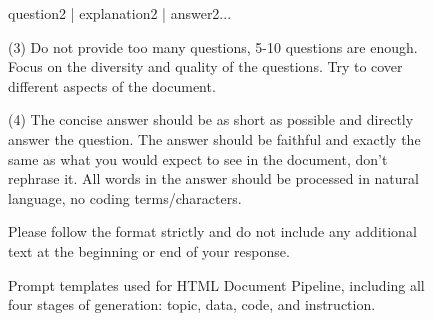 \begin{figure}[!h]
\begin{center}
\begin{tcolorbox} [top=3pt,bottom=3pt, left=3pt, right=3pt, width=\linewidth, boxrule=1pt]
{{    question2 | explanation2 | answer2...
    
    (3) Do not provide too many questions, 5-10 questions are enough. Focus on the diversity and quality of the questions. Try to cover different aspects of the document.
    
    (4) The concise answer should be as short as possible and directly answer the question. The answer should be faithful and exactly the same as what you would expect to see in the document, don't rephrase it. All words in the answer should be processed in natural language, no coding terms/characters.
    
Please follow the format strictly and do not include any additional text at the beginning or end of your response.}    \par}
    \end{tcolorbox}


    \end{center}
    \vspace{-0.3cm}
    \caption{Prompt templates used for HTML Document Pipeline, including all four stages of generation: topic, data, code, and instruction.}
    \label{fig:prompt-html}
    \vspace{-0.3cm}
\end{figure}